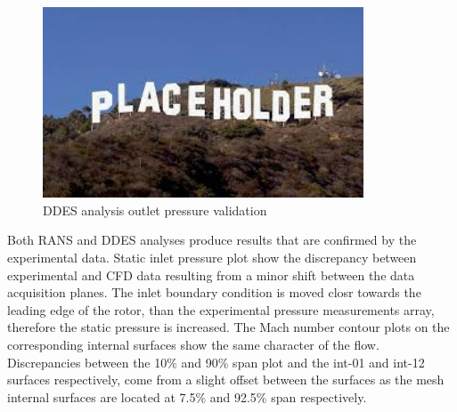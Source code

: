 \begin{figure}[h!]
\centering %
\includegraphics[width=0.85\textwidth]{Pictures/placeholder.jpg}
\caption{DDES analysis outlet pressure validation}
\label{pvalid_ddes_out}
\end{figure}

Both RANS and DDES analyses produce results that are confirmed by the experimental data. Static inlet pressure plot show the discrepancy between experimental and CFD data resulting from a minor shift between the data acquisition planes. The inlet boundary condition is moved closr towards the leading edge of the rotor, than the experimental pressure measurements array, therefore the static pressure is increased. The Mach number contour plots on the corresponding internal surfaces show the same character of the flow. Discrepancies between the 10\% and 90\% span plot and the int-01 and int-12 surfaces respectively, come from a slight offset between the surfaces as the mesh internal surfaces are located at 7.5\% and 92.5\% span respectively.